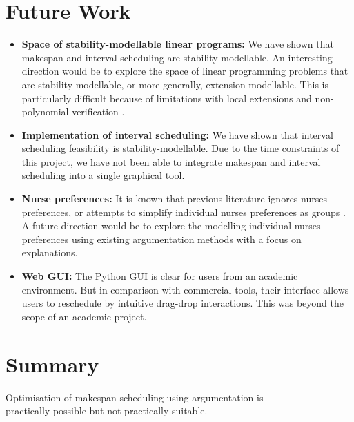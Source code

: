 \section{Future Work}

\begin{itemize}
	\item\textbf{Space of stability-modellable linear programs:} We have shown that makespan and interval scheduling are stability-modellable. An interesting direction would be to explore the space of linear programming problems that are stability-modellable, or more generally, extension-modellable. This is particularly difficult because of limitations with local extensions and non-polynomial verification \cite{aes}.
	\item\textbf{Implementation of interval scheduling:} We have shown that interval scheduling feasibility is stability-modellable. Due to the time constraints of this project, we have not been able to integrate makespan and interval scheduling into a single graphical tool.
	\item\textbf{Nurse preferences:} It is known that previous literature ignores nurses preferences, or attempts to simplify individual nurses preferences as groups \cite{preferences}. A future direction would be to explore the modelling individual nurses preferences using existing argumentation methods \cite{acceptability, aba} with a focus on explanations.
	\item\textbf{Web GUI:} The Python GUI is clear for users from an academic environment. But in comparison with commercial tools, their interface allows users to reschedule by intuitive drag-drop interactions. This was beyond the scope of an academic project.
\end{itemize}

\section{Summary}

\begin{framed}
	\centering
	Optimisation of makespan scheduling using argumentation is\\practically
	possible but not practically suitable.
\end{framed}